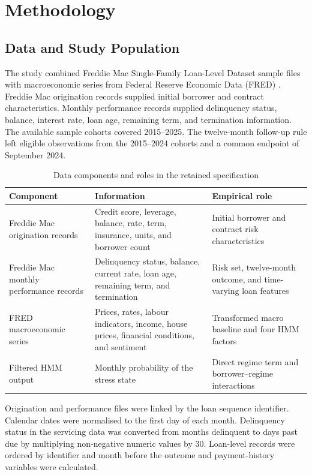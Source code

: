 \chapter{Methodology}
\label{chap:methodology}

\section{Data and Study Population}

The study combined Freddie Mac Single-Family Loan-Level Dataset sample files with macroeconomic series from Federal Reserve Economic Data (FRED) \citep{freddiemac_loanlevel,fred_database}. Freddie Mac origination records supplied initial borrower and contract characteristics. Monthly performance records supplied delinquency status, balance, interest rate, loan age, remaining term, and termination information. The available sample cohorts covered 2015--2025. The twelve-month follow-up rule left eligible observations from the 2015--2024 cohorts and a common endpoint of September 2024.

\begin{table}[htbp]
\centering
\caption{Data components and roles in the retained specification}
\label{tab:data-components}
\small
\begin{tabular}{L{0.24\textwidth}L{0.31\textwidth}L{0.32\textwidth}}
\toprule
Component & Information & Empirical role \\
\midrule
Freddie Mac origination records & Credit score, leverage, balance, rate, term, insurance, units, and borrower count & Initial borrower and contract risk characteristics \\
Freddie Mac monthly performance records & Delinquency status, balance, current rate, loan age, remaining term, and termination & Risk set, twelve-month outcome, and time-varying loan features \\
FRED macroeconomic series & Prices, rates, labour indicators, income, house prices, financial conditions, and sentiment & Transformed macro baseline and four HMM factors \\
Filtered HMM output & Monthly probability of the stress state & Direct regime term and borrower--regime interactions \\
\bottomrule
\end{tabular}
\end{table}

Origination and performance files were linked by the loan sequence identifier. Calendar dates were normalised to the first day of each month. Delinquency status in the servicing data was converted from months delinquent to days past due by multiplying non-negative numeric values by 30. Loan-level records were ordered by identifier and month before the outcome and payment-history variables were calculated.


